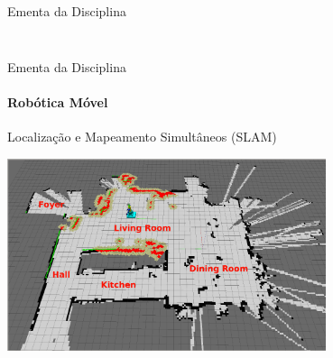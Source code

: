 \documentclass{beamer}
\begin{document}
\begin{frame}[t]{Ementa da Disciplina}
\begin{columns}[c]
\begin{column}{0.5\textwidth}
\begin{figure}
				{\cite{martinez2013learning}}
		\end{figure}
		\end{column}
	\end{columns}
\end{frame}


\begin{frame}[c]{Ementa da Disciplina}
	\framesubtitle{Robótica Móvel}
	\begin{block}{Localização e Mapeamento Simultâneos (SLAM)}
	\end{block}
	\begin{center}
		\includegraphics[width=0.7\textwidth]{./images/slam-example.png}
	\end{center}
\end{frame}
\end{document}
